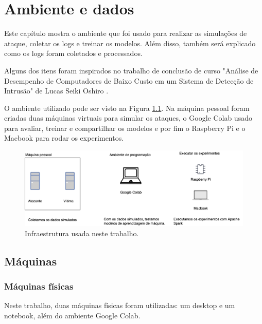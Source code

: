 
\chapter{Ambiente e dados}
\label{cap:data}

Este capítulo mostra o ambiente que foi usado para realizar as simulações de ataque,
coletar os logs e treinar os modelos. Além disso, também será explicado como os logs 
foram coletados e processados.

Alguns dos itens foram inspirados no trabalho de conclusão de curso "Análise de 
Desempenho de Computadores de Baixo Custo em um Sistema de Detecção de Intrusão" de 
Lucas Seiki Oshiro \cite{tcc:lucas}.

O ambiente utilizado pode ser visto na Figura \ref{fig:arquitetura_total}. Na máquina pessoal foram 
criadas duas máquinas virtuais para simular os ataques, o Google Colab 
usado para avaliar, treinar e compartilhar os modelos e por fim o Raspberry Pi e o Macbook 
para rodar os experimentos.

\begin{figure}
    \centering
    \includegraphics[width=1\textwidth]{figuras/arquitetura_total.png}
    \caption{Infraestrutura usada neste trabalho. \label{fig:arquitetura_total}}
\end{figure}


\section{Máquinas}

\subsection{Máquinas físicas}

Neste trabalho, duas máquinas físicas foram utilizadas: um desktop e um notebook, além do ambiente Google Colab. 

